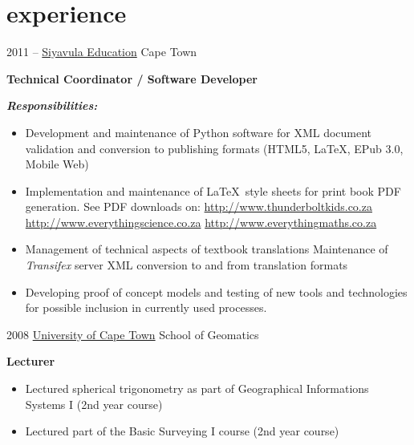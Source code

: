 \documentclass[]{friggeri-cv} %
\begin{document}

\section{experience}
\begin{entrylist}
\entry
{2011 -- }
{\href{http://www.siyavula.com}{Siyavula Education}}
{Cape Town}
{%
\textbf{Technical Coordinator / Software Developer}

\textbf{\textit{Responsibilities:}}
\begin{itemize}
\item Development and maintenance of Python software for XML document validation and conversion to publishing formats (HTML5, \LaTeX, EPub 3.0, Mobile Web)
\item Implementation and maintenance of \LaTeX~style sheets for print book PDF generation. See PDF downloads on:
    \subitem \url{http://www.thunderboltkids.co.za}
    \subitem \url{http://www.everythingscience.co.za}
    \subitem \url{http://www.everythingmaths.co.za}

\item Management of technical aspects of textbook translations
    \subitem Maintenance of \emph{Transifex} server
    \subitem XML conversion to and from translation formats

\item Developing proof of concept models and testing of new tools and technologies for possible inclusion in currently used processes.
\end{itemize}
}
\end{entrylist}
\begin{entrylist}
%
\entry
{2008}
{\href{http://www.uct.ac.za}{University of Cape Town}}
{School of Geomatics}
{%
\textbf{Lecturer}
\begin{itemize}
    \item Lectured spherical trigonometry as part of Geographical Informations Systems I (2nd year course)
    \item Lectured part of the Basic Surveying I course (2nd year course)
\end{itemize}
}
\end{entrylist}
\end{document}
